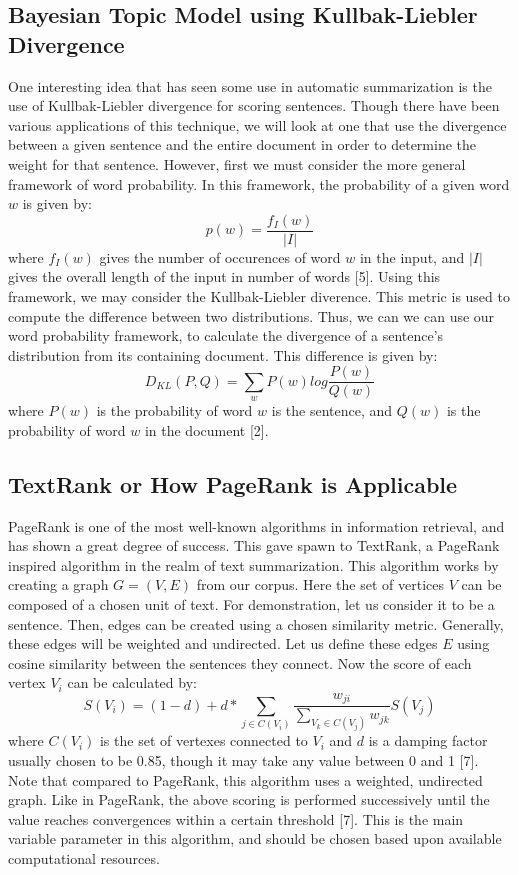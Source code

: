 \documentclass[11pt]{article}
\begin{document}
\subsection{Bayesian Topic Model using Kullbak-Liebler Divergence}
\label{sec:orgb97ebf5}
One interesting idea that has seen some use in automatic summarization is the use of Kullbak-Liebler divergence for scoring sentences. Though there have been various applications of this technique, we will look at one that use the divergence between a given sentence and the entire document in order to determine the weight for that sentence. However, first we must consider the more general framework of word probability. In this framework, the probability of a given word \(w\) is given by:
\begin{equation}
p(w) = \frac{f_I(w)}{|I|}
\end{equation}
where \(f_I(w)\) gives the number of occurences of word \(w\) in the input, and \(|I|\) gives the overall length of the input in number of words [5]. Using this framework, we may consider the Kullbak-Liebler diverence. This metric is used to compute the difference between two distributions. Thus, we can we can use our word probability framework, to calculate the divergence of a sentence's distribution from its containing document. This difference is given by:
\begin{equation}
D_{KL}(P, Q)=\sum_w P(w)log\frac{P(w)}{Q(w)}
\end{equation}
where \(P(w)\) is the probability of word \(w\) is the sentence, and \(Q(w)\) is the probability of word \(w\) in the document [2].
\subsection{TextRank or How PageRank is Applicable}
\label{sec:orge8c346f}
PageRank is one of the most well-known algorithms in information retrieval, and has shown a great degree of success. This gave spawn to TextRank, a PageRank inspired algorithm in the realm of text summarization. This algorithm works by creating a graph \(G=(V,E)\) from our corpus. Here the set of vertices \(V\) can be composed of a chosen unit of text. For demonstration, let us consider it to be a sentence. Then, edges can be created using a chosen similarity metric. Generally, these edges will be weighted and undirected. Let us define these edges \(E\) using cosine similarity between the sentences they connect. Now the score of each vertex \(V_i\) can be calculated by:
\begin{equation}
S(V_i)=(1-d)+d*\sum_{j\in C(V_i)}\frac{w_{ji}}{\sum_{V_k\in C(V_j)}w_{jk}}S(V_j)
\end{equation}
where \(C(V_i)\) is the set of vertexes connected to \(V_i\) and \(d\) is a damping factor usually chosen to be 0.85, though it may take any value between 0 and 1 [7]. Note that compared to PageRank, this algorithm uses a weighted, undirected graph. Like in PageRank, the above scoring is performed successively until the value reaches convergences within a certain threshold [7]. This is the main variable parameter in this algorithm, and should be chosen based upon available computational resources.
\end{document}
